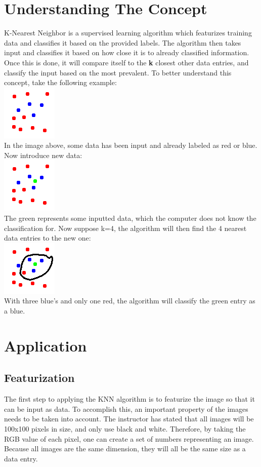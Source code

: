\documentclass[]{report}
\begin{document}
\section{Understanding The Concept}
{\fontsize{14}{4}\selectfont K-Nearest Neighbor is a supervised learning algorithm which featurizes training data and classifies it based on the provided labels. The algorithm then takes input and classifies it based on how close it is to already classified information. Once this is done, it will compare itself to the \textbf{k} closest other data entries, and classify the input based on the most prevalent. To better understand this concept, take the following example:\\
\includegraphics{knn0}\\
In the image above, some data has been input and already labeled as red or blue. Now introduce new data:\\
\includegraphics{knn1}\\
The green represents some inputted data, which the computer does not know the classification for. Now suppose k=4, the algorithm will then find the 4 nearest data entries to the new one:\\
\includegraphics{knn2}\\
With three blue's and only one red, the algorithm will classify the green entry as a blue.}
\section{Application}
\subsection{Featurization}
{\fontsize{14}{4}\selectfont The first step to applying the KNN algorithm is to featurize the image so that it can be input as data. To accomplish this, an important property of the images needs to be taken into account. The instructor has stated that all images will be 100x100 pixels in size, and only use black and white. Therefore, by taking the RGB value of each pixel, one can create a set of numbers representing an image. Because all images are the same dimension, they will all be the same size as a data entry. }
\end{document}
